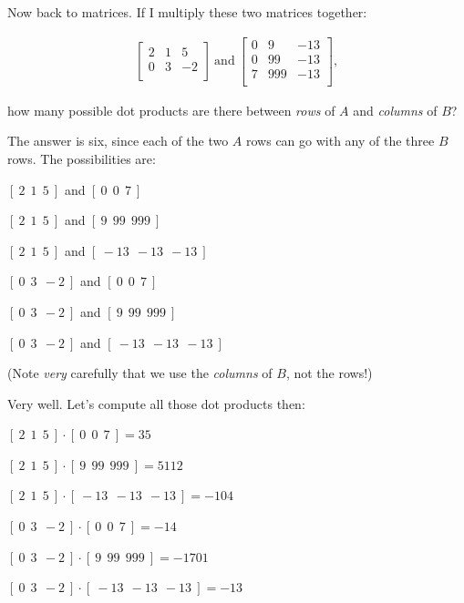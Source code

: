 Now back to matrices. If I multiply these two matrices together:

\vspace{-.15in}
\begin{align*}
\begin{bmatrix}
2 & 1 & 5 \\
0 & 3 & -2 \\
\end{bmatrix} \ \text{and} \ 
\begin{bmatrix}
0 & 9 & -13 \\
0 & 99 & -13 \\
7 & 999 & -13 \\
\end{bmatrix},
\end{align*}
\vspace{-.15in}

how many possible dot products are there between \textit{rows} of $A$ and
\textit{columns} of $B$?

The answer is six, since each of the two $A$ rows can go with any of the three
$B$ rows. The possibilities are:

\begin{compactenum}
\item $[\ 2\ \ 1\ \ 5\ ]$ and $[\ 0\ \ 0\ \ 7\ ]$
\item $[\ 2\ \ 1\ \ 5\ ]$ and $[\ 9\ \ 99\ \ 999\ ]$
\item $[\ 2\ \ 1\ \ 5\ ]$ and $[\ -13\ \ -13\ \ -13\ ]$
\item $[\ 0\ \ 3\ \ -2\ ]$ and $[\ 0\ \ 0\ \ 7\ ]$
\item $[\ 0\ \ 3\ \ -2\ ]$ and $[\ 9\ \ 99\ \ 999\ ]$
\item $[\ 0\ \ 3\ \ -2\ ]$ and $[\ -13\ \ -13\ \ -13\ ]$
\end{compactenum}

(Note \textit{very} carefully that we use the \textit{columns} of $B$, not the
rows!)

\smallskip
Very well. Let's compute all those dot products then:

\begin{compactitem}
\item $[\ 2\ \ 1\ \ 5\ ] \cdot [\ 0\ \ 0\ \ 7\ ] = 35$
\item $[\ 2\ \ 1\ \ 5\ ] \cdot [\ 9\ \ 99\ \ 999\ ] = 5112$
\item $[\ 2\ \ 1\ \ 5\ ] \cdot [\ -13\ \ -13\ \ -13\ ] = -104$
\item $[\ 0\ \ 3\ \ -2\ ] \cdot [\ 0\ \ 0\ \ 7\ ] = -14$
\item $[\ 0\ \ 3\ \ -2\ ] \cdot [\ 9\ \ 99\ \ 999\ ] = -1701$
\item $[\ 0\ \ 3\ \ -2\ ] \cdot [\ -13\ \ -13\ \ -13\ ] = -13$
\end{compactitem}

